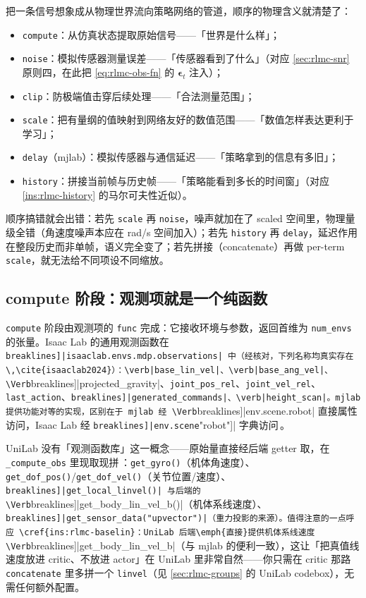 \begin{insight}\label{ins:rlmc-pipeline}
把一条信号想象成从物理世界流向策略网络的管道，顺序的物理含义就清楚了：
\begin{itemize}
  \item \texttt{compute}：从仿真状态提取原始信号——「世界是什么样」；
  \item \texttt{noise}：模拟传感器测量误差——「传感器看到了什么」（对应 \cref{sec:rlmc-snr} 原则四，在此把 \cref{eq:rlmc-obs-fn} 的 $\boldsymbol\epsilon_t$ 注入）；
  \item \texttt{clip}：防极端值击穿后续处理——「合法测量范围」；
  \item \texttt{scale}：把有量纲的值映射到网络友好的数值范围——「数值怎样表达更利于学习」；
  \item \texttt{delay}（mjlab）：模拟传感器与通信延迟——「策略拿到的信息有多旧」；
  \item \texttt{history}：拼接当前帧与历史帧——「策略能看到多长的时间窗」（对应 \cref{ins:rlmc-history} 的马尔可夫性近似）。
\end{itemize}
顺序搞错就会出错：若先 \texttt{scale} 再 \texttt{noise}，噪声就加在了 scaled 空间里，物理量级全错（角速度噪声本应在 rad/s 空间加入）；若先 \texttt{history} 再 \texttt{delay}，延迟作用在整段历史而非单帧，语义完全变了；若先拼接（concatenate）再做 per-term \texttt{scale}，就无法给不同项设不同缩放。
\end{insight}

\subsection{compute 阶段：观测项就是一个纯函数}
\label{sec:rlmc-compute}

\verb|compute| 阶段由观测项的 \verb|func| 完成：它接收环境与参数，返回首维为 \verb|num_envs| 的张量。Isaac Lab 的通用观测函数在 \Verb[breaklines]|isaaclab.envs.mdp.observations| 中（经核对，下列名称均真实存在\,\cite{isaaclab2024}）：\verb|base_lin_vel|、\verb|base_ang_vel|、\Verb[breaklines]|projected_gravity|、\verb|joint_pos_rel|、\verb|joint_vel_rel|、\verb|last_action|、\Verb[breaklines]|generated_commands|、\verb|height_scan|。mjlab 提供功能对等的实现，区别在于 mjlab 经 \Verb[breaklines]|env.scene.robot| 直接属性访问，Isaac Lab 经 \Verb[breaklines]|env.scene["robot"]| 字典访问\,\cite{mjlab2026}。

UniLab 没有「观测函数库」这一概念——原始量直接经后端 getter 取，在 \verb|_compute_obs| 里现取现拼\,\cite{unilab2026}：\verb|get_gyro()|（机体角速度）、\verb|get_dof_pos()|/\allowbreak\verb|get_dof_vel()|（关节位置/速度）、\Verb[breaklines]|get_local_linvel()| 与后端的 \Verb[breaklines]|get_body_lin_vel_b()|（机体系线速度）、\Verb[breaklines]|get_sensor_data("upvector")|（重力投影的来源）。值得注意的一点呼应 \cref{ins:rlmc-baselin}：UniLab 后端\emph{直接}提供机体系线速度 \Verb[breaklines]|get_body_lin_vel_b|（与 mjlab 的便利一致），这让「把真值线速度放进 critic、不放进 actor」在 UniLab 里非常自然——你只需在 critic 那路 \verb|concatenate| 里多拼一个 \verb|linvel|（见 \cref{sec:rlmc-groups} 的 UniLab codebox），无需任何额外配置。

